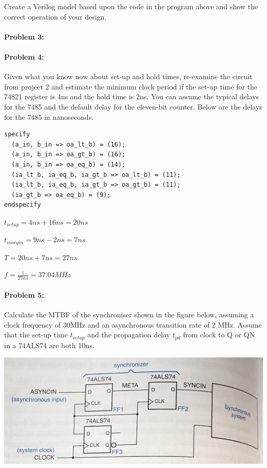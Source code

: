 \documentclass[12pt,letterpaper,titlepage]{article}
\begin{document}
\begin{raggedright}
Create a Verilog model based upon the code in the program above 	and show the correct operation of your design.

\paragraph{Problem 3: }
\clearpage
\paragraph{Problem 4: }
Given what you know now about set-up and hold times, re-examine the circuit from project 2 and estimate the minimum clock period if the set-up time for the 74821 register is 4ns and the hold time is 2ns. You can assume the typical delays for the 7485 and the default delay for the eleven-bit counter. Below are the delays for the 7485 in nanoseconds.
 
\begin{lstlisting}
specify
  (a_in, b_in => oa_lt_b) = (16);
  (a_in, b_in => oa_gt_b) = (16);
  (a_in, b_in => oa_eq_b) = (14);
  (ia_lt_b, ia_eq_b, ia_gt_b => oa_lt_b) = (11);
  (ia_lt_b, ia_eq_b, ia_gt_b => oa_gt_b) = (11);
  (ia_gt_b => oa_eq_b) = (9);
endspecify
\end{lstlisting}

$t_{setup} = 4ns + 16ns = 20ns$

$t_{margin} = 9ns - 2ns = 7ns$

$T = 20ns + 7ns = 27ns$

$f = \frac{1}{27ns} = 37.04MHz$

\paragraph{Problem 5: }
Calculate the MTBF of the synchroniser shown in the figure below, assuming a clock frequency of 30MHz and an asynchronous transition rate of 2 MHz. Assume that the set-up time $t_{setup}$ and the propagation delay $t_{pd}$ from clock to Q or QN in a 74ALS74 are both 10ns.

\begin{center}
\includegraphics[width=\textwidth]{p5}
\end{center}


\end{raggedright}
\end{document}
